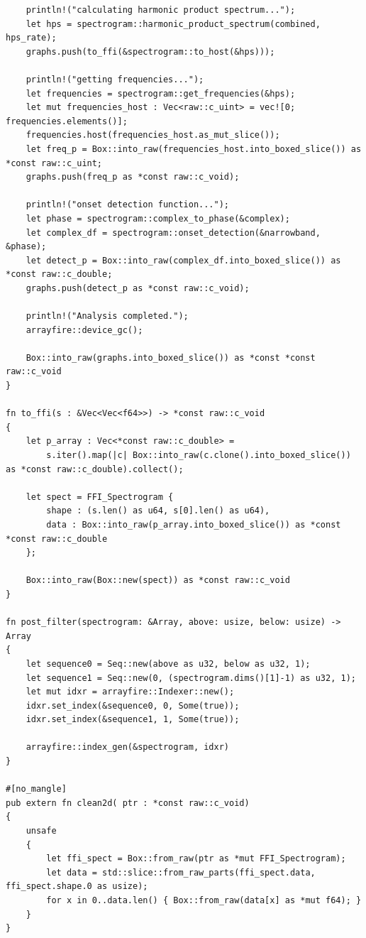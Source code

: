 \documentclass[a4paper,12pt]{report}
\begin{document}
\begin{verbatim}
    println!("calculating harmonic product spectrum...");
    let hps = spectrogram::harmonic_product_spectrum(combined, hps_rate);
    graphs.push(to_ffi(&spectrogram::to_host(&hps)));    

    println!("getting frequencies...");
    let frequencies = spectrogram::get_frequencies(&hps);
    let mut frequencies_host : Vec<raw::c_uint> = vec![0; frequencies.elements()];
    frequencies.host(frequencies_host.as_mut_slice());
    let freq_p = Box::into_raw(frequencies_host.into_boxed_slice()) as *const raw::c_uint;
    graphs.push(freq_p as *const raw::c_void);

    println!("onset detection function...");
    let phase = spectrogram::complex_to_phase(&complex);
    let complex_df = spectrogram::onset_detection(&narrowband, &phase);
    let detect_p = Box::into_raw(complex_df.into_boxed_slice()) as *const raw::c_double;
    graphs.push(detect_p as *const raw::c_void);

    println!("Analysis completed.");    
    arrayfire::device_gc();

    Box::into_raw(graphs.into_boxed_slice()) as *const *const raw::c_void
}

fn to_ffi(s : &Vec<Vec<f64>>) -> *const raw::c_void
{
    let p_array : Vec<*const raw::c_double> = 
        s.iter().map(|c| Box::into_raw(c.clone().into_boxed_slice()) as *const raw::c_double).collect();
        
    let spect = FFI_Spectrogram {
        shape : (s.len() as u64, s[0].len() as u64),
        data : Box::into_raw(p_array.into_boxed_slice()) as *const *const raw::c_double
    };

    Box::into_raw(Box::new(spect)) as *const raw::c_void
}

fn post_filter(spectrogram: &Array, above: usize, below: usize) -> Array
{
    let sequence0 = Seq::new(above as u32, below as u32, 1);
    let sequence1 = Seq::new(0, (spectrogram.dims()[1]-1) as u32, 1);
    let mut idxr = arrayfire::Indexer::new();            
    idxr.set_index(&sequence0, 0, Some(true));
    idxr.set_index(&sequence1, 1, Some(true));    
  
    arrayfire::index_gen(&spectrogram, idxr)
}

#[no_mangle]
pub extern fn clean2d( ptr : *const raw::c_void) 
{
    unsafe 
    { 
        let ffi_spect = Box::from_raw(ptr as *mut FFI_Spectrogram);
        let data = std::slice::from_raw_parts(ffi_spect.data, ffi_spect.shape.0 as usize);
        for x in 0..data.len() { Box::from_raw(data[x] as *mut f64); }
    }
}


\end{verbatim}
\end{document}
